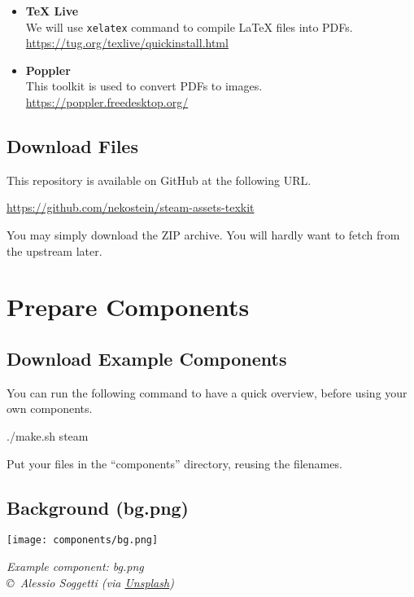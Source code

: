 \documentclass[11pt,a4paper]{report}
\providecommand{\colorhref}[2]{\textcolor{black!20!blue!80!green}{\href{#1}{#2}}}
\begin{document}
\begin{itemize}
	\item \textbf{TeX Live}\\
	      We will use \texttt{xelatex} command to compile LaTeX files into PDFs.\\
	      \colorhref{https://tug.org/texlive/quickinstall.html}{https://tug.org/texlive/quickinstall.html}

	\item \textbf{Poppler}\\
	      This toolkit is used to convert PDFs to images.\\
	      \colorhref{https://poppler.freedesktop.org/}{https://poppler.freedesktop.org/}
\end{itemize}

\section{Download Files}

This repository is available on GitHub at the following URL.

\begin{center}
	\colorhref{https://github.com/nekostein/steam-assets-texkit}{https://github.com/nekostein/steam-assets-texkit}
\end{center}

You may simply download the ZIP archive. You will hardly want to fetch from the upstream later.



\chapter{Prepare Components}

\section{Download Example Components}
You can run the following command to have a quick overview, before using your own components.

\begin{center}
	\ttfamily ./make.sh steam
\end{center}

Put your files in the ``components'' directory, reusing the filenames.

\section{Background (bg.png)}
\begin{minipage}{\linewidth}
	\center\sffamily
	\texttt{[image: components/bg.png]}\par
	\small\itshape
	Example component: bg.png\\
	\copyright~Alessio Soggetti (via \colorhref{https://unsplash.com/photos/view-of-mountain-PdGBci-4jR8}{Unsplash})
\end{minipage}
\end{document}
